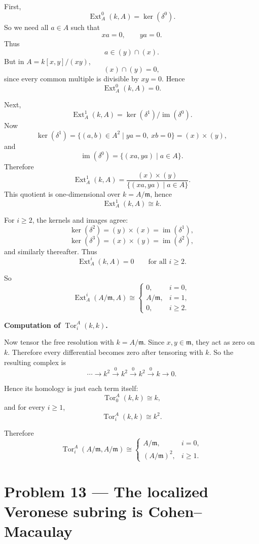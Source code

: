 \documentclass[12pt,a4paper,oneside]{report}
\theoremstyle{notespace}
\begin{document}
First,
\[
\operatorname{Ext}_A^0(k,A)=\ker(\delta^0).
\]
So we need all \(a\in A\) such that
\[
xa=0,\qquad ya=0.
\]
Thus
\[
a\in (y)\cap (x).
\]
But in \(A=k[x,y]/(xy)\),
\[
(x)\cap (y)=0,
\]
since every common multiple is divisible by \(xy=0\). Hence
\[
\operatorname{Ext}_A^0(k,A)=0.
\]

Next,
\[
\operatorname{Ext}_A^1(k,A)=\ker(\delta^1)/\operatorname{im}(\delta^0).
\]
Now
\[
\ker(\delta^1)=\{(a,b)\in A^2\mid ya=0,\ xb=0\}=(x)\times (y),
\]
and
\[
\operatorname{im}(\delta^0)=\{(xa,ya)\mid a\in A\}.
\]
Therefore
\[
\operatorname{Ext}_A^1(k,A)
=
\frac{(x)\times (y)}{\{(xa,ya)\mid a\in A\}}.
\]
This quotient is one-dimensional over \(k=A/\mathfrak m\), hence
\[
\operatorname{Ext}_A^1(k,A)\cong k.
\]

For \(i\ge 2\), the kernels and images agree:
\[
\ker(\delta^2)=(y)\times (x)=\operatorname{im}(\delta^1),
\]
\[
\ker(\delta^3)=(x)\times (y)=\operatorname{im}(\delta^2),
\]
and similarly thereafter. Thus
\[
\operatorname{Ext}_A^i(k,A)=0
\qquad\text{for all }i\ge 2.
\]

So
\[
\operatorname{Ext}_A^i(A/\mathfrak m,A)\cong
\begin{cases}
	0,& i=0,\\[1mm]
	A/\mathfrak m,& i=1,\\[1mm]
	0,& i\ge 2.
\end{cases}
\]

\medskip

\textbf{Computation of \(\operatorname{Tor}_i^A(k,k)\).}

Now tensor the free resolution with \(k=A/\mathfrak m\). Since \(x,y\in \mathfrak m\), they act as zero on \(k\). Therefore every differential becomes zero after tensoring with \(k\). So the resulting complex is
\[
\cdots \to k^2 \xrightarrow{0} k^2 \xrightarrow{0} k^2 \xrightarrow{0} k \to 0.
\]

Hence its homology is just each term itself:
\[
\operatorname{Tor}_0^A(k,k)\cong k,
\]
and for every \(i\ge 1\),
\[
\operatorname{Tor}_i^A(k,k)\cong k^2.
\]

Therefore
\[
\operatorname{Tor}_i^A(A/\mathfrak m,A/\mathfrak m)\cong
\begin{cases}
	A/\mathfrak m,& i=0,\\[1mm]
	(A/\mathfrak m)^2,& i\ge 1.
\end{cases}
\]

\section{Problem 13 --- The localized Veronese subring is Cohen--Macaulay}
\end{document}
